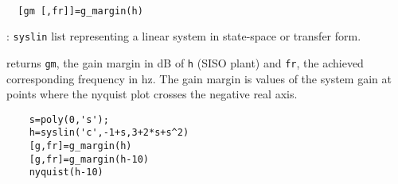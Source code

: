 \begin{mandesc}
   \\ %
\end{mandesc}
\begin{calling_sequence}
\begin{verbatim}
  [gm [,fr]]=g_margin(h)   
\end{verbatim}
\end{calling_sequence}
\begin{parameters}
  \begin{varlist}
    : \verb!syslin! list representing a linear system 
    in state-space or transfer form.
  \end{varlist}
\end{parameters}
\begin{mandescription}
  returns \verb!gm!, the gain margin in dB of \verb!h! 
  (SISO plant) and \verb!fr!, the achieved corresponding frequency in hz.
  The gain margin is values of the system gain at points where the
  nyquist plot crosses the negative real axis.
\end{mandescription}
\begin{examples}
  \begin{Verbatim}
    s=poly(0,'s');
    h=syslin('c',-1+s,3+2*s+s^2)
    [g,fr]=g_margin(h)
    [g,fr]=g_margin(h-10)
    nyquist(h-10)
  \end{Verbatim}
\end{examples}
\begin{manseealso}
       
\end{manseealso}
